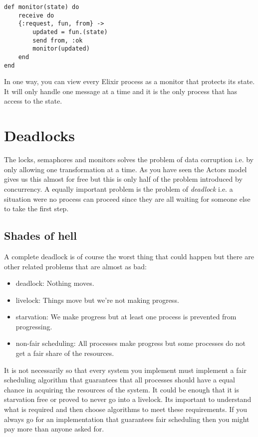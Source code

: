 \documentclass[a4paper,11pt]{article}
\begin{document}
\begin{verbatim}
def monitor(state) do
    receive do
    {:request, fun, from} ->
        updated = fun.(state)
        send from, :ok
        monitor(updated)
    end
end
\end{verbatim}

In one way, you can view every Elixir process as a monitor that
protects its state. It will only handle one message at a time and it
is the only process that has access to the state.



\section{Deadlocks}

The locks, semaphores and monitors solves the problem of data
corruption i.e. by only allowing one transformation at a time. As you
have seen the Actors model gives us this almost for free but this is
only half of the problem introduced by concurrency. A equally important
problem is the problem of {\em deadlock} i.e. a situation were no
process can proceed since they are all waiting for someone else to
take the first step.


\subsection{Shades of hell}

A complete deadlock is of course the worst thing that could happen but
there are other related problems that are almost as bad:

\begin{itemize}
    \item deadlock: Nothing moves.
    \item livelock: Things move but we're not making progress.
    \item starvation: We make progress but at least one process is prevented from progressing.
    \item non-fair scheduling: All processes make progress but some processes do not get a fair share of the resources. 
\end{itemize}

It is not necessarily so that every system you implement must
implement a fair scheduling algorithm that guarantees that all
processes should have a equal chance in acquiring the resources of the
system. It could be enough that it is starvation free or proved to
never go into a livelock. Its important to understand what is required
and then choose algorithms to meet these requirements. If you always
go for an implementation that guarantees fair scheduling then you
might pay more than anyone asked for.
\end{document}
